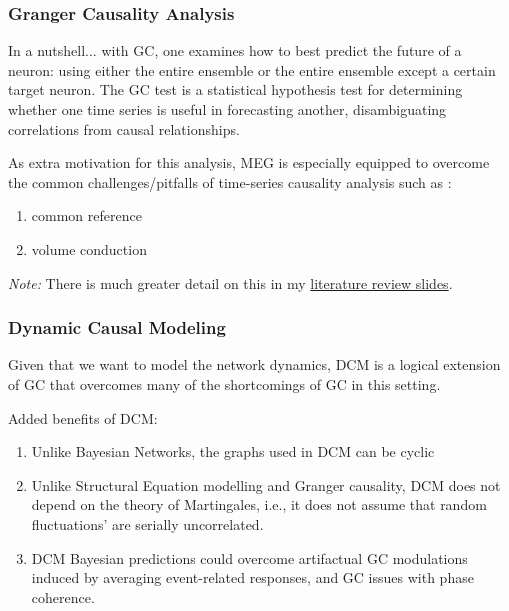 \documentclass[usletter,12pt]{article} %
\begin{document}

\subsubsection{Granger Causality Analysis}

\noindent 
In a nutshell... with GC, one examines how to best predict the future of a neuron: using either the entire ensemble or the entire ensemble except a certain target neuron.  The GC test is a statistical hypothesis test for determining whether one time series is useful in forecasting another, disambiguating correlations from causal relationships. 

\noindent 
As extra motivation for this analysis, MEG is especially equipped to overcome the common challenges/pitfalls of time-series causality analysis such as \cite{ding2014analyzing}: 

\begin{enumerate}
\item common reference  
\item volume conduction
\end{enumerate}

\noindent 
\textit{Note:} There is much greater detail on this in my \hyperref[extra-material]{literature review slides}.


\subsubsection{Dynamic Causal Modeling}

\noindent
Given that we want to model the network dynamics, DCM is a logical extension of GC that overcomes many of the shortcomings of GC in this setting.

\noindent
Added benefits of DCM:
\begin{enumerate}
\item Unlike Bayesian Networks, the graphs used in DCM can be cyclic
\item Unlike Structural Equation modelling and Granger causality, DCM does not depend on the theory of Martingales, i.e., it does not assume that random fluctuations' are serially uncorrelated.
\item DCM Bayesian predictions could overcome artifactual GC modulations induced by averaging event-related responses, and GC issues with phase coherence.
\end{enumerate}
\end{document}
